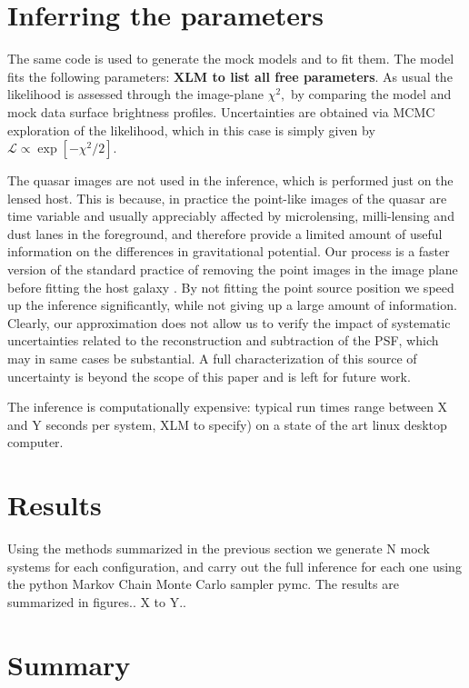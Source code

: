 \documentclass[a4paper,11pt]{article}
\begin{document}
\section{Inferring the parameters}

The same code is used to generate the mock models and to fit them. The
model fits the following parameters: {\bf XLM to list all free
parameters}. As usual the likelihood is assessed through the
image-plane $\chi^{2},$ by comparing the model and mock data surface
brightness profiles.  Uncertainties are obtained via MCMC exploration
of the likelihood, which in this case is simply given by
$\mathcal{L}\propto\exp[-\chi^{2}/2].$

The quasar images are not used in the inference, which is performed
just on the lensed host. This is because, in practice the point-like
images of the quasar are time variable and usually appreciably
affected by microlensing, milli-lensing and dust lanes in the
foreground, and therefore provide a limited amount of useful
information on the differences in gravitational potential. Our process
is a faster version of the standard practice of removing the point
images in the image plane before fitting the host galaxy
\cite{Suyu++13}. By not fitting the point source position we speed up
the inference significantly, while not giving up a large amount of
information. Clearly, our approximation does not allow us to verify
the impact of systematic uncertainties related to the reconstruction
and subtraction of the PSF, which may in same cases be substantial. A
full characterization of this source of uncertainty is beyond the
scope of this paper and is left for future work.

The inference is computationally expensive: typical run times range
between X and Y seconds per system, XLM to specify) on a state of the
art linux desktop computer.

\section{Results}

Using the methods summarized in the previous section we generate N
mock systems for each configuration, and carry out the full inference
for each one using the python Markov Chain Monte Carlo sampler pymc.
The results are summarized in figures.. X to Y..

\section{Summary}
\end{document}
